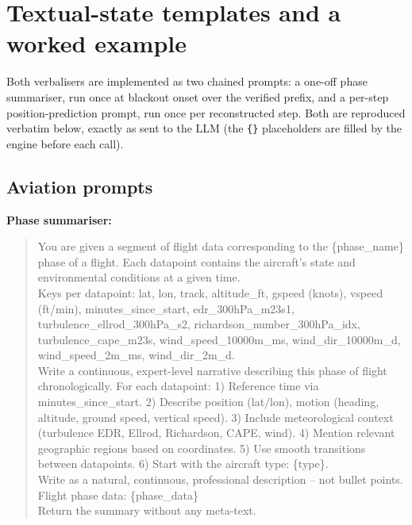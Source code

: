 \section{Textual-state templates and a worked example}
\label{app:templates}

Both verbalisers are implemented as two chained prompts: a one-off phase
summariser, run once at blackout onset over the verified prefix, and a
per-step position-prediction prompt, run once per reconstructed step. Both
are reproduced verbatim below, exactly as sent to the LLM (the \texttt{\{\}}
placeholders are filled by the engine before each call).

\subsection{Aviation prompts}

\textbf{Phase summariser:}
\begin{quote}
\footnotesize\ttfamily
You are given a segment of flight data corresponding to the \{phase\_name\}
phase of a flight. Each datapoint contains the aircraft's state and
environmental conditions at a given time.\\[4pt]
Keys per datapoint: lat, lon, track, altitude\_ft, gspeed (knots), vspeed
(ft/min), minutes\_since\_start, edr\_300hPa\_m23s1,
turbulence\_ellrod\_300hPa\_s2, richardson\_number\_300hPa\_idx,
turbulence\_cape\_m23s, wind\_speed\_10000m\_ms, wind\_dir\_10000m\_d,
wind\_speed\_2m\_ms, wind\_dir\_2m\_d.\\[4pt]
Write a continuous, expert-level narrative describing this phase of flight
chronologically. For each datapoint: 1) Reference time via
minutes\_since\_start. 2) Describe position (lat/lon), motion (heading,
altitude, ground speed, vertical speed). 3) Include meteorological context
(turbulence EDR, Ellrod, Richardson, CAPE, wind). 4) Mention relevant
geographic regions based on coordinates. 5) Use smooth transitions between
datapoints. 6) Start with the aircraft type: \{type\}.\\[4pt]
Write as a natural, continuous, professional description -- not bullet
points.\\[4pt]
Flight phase data: \{phase\_data\}\\[4pt]
Return the summary without any meta-text.
\end{quote}

